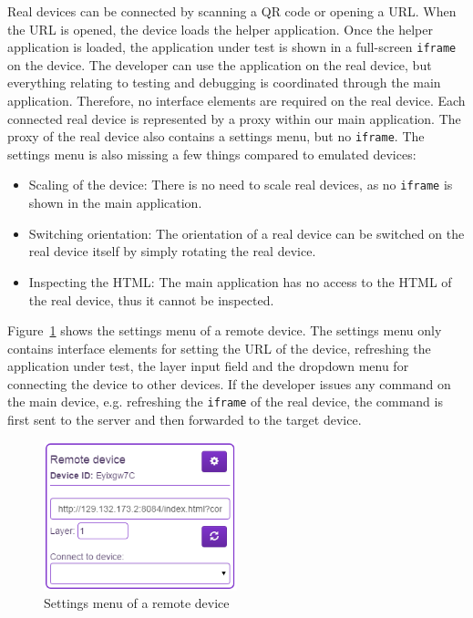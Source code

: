 Real devices can be connected by scanning a QR code or opening a URL. When the URL is opened, the device loads the helper application. Once the helper application is loaded, the application under test is shown in a full-screen \lstinline|iframe| on the device. The developer can use the application on the real device, but everything relating to testing and debugging is coordinated through the main application. Therefore, no interface elements are required on the real device. Each connected real device is represented by a proxy within our main application. The proxy of the real device also contains a settings menu, but no \lstinline|iframe|. The settings menu is also missing a few things compared to emulated devices:
\begin{itemize}
	\item Scaling of the device: There is no need to scale real devices, as no \lstinline|iframe| is shown in the main application.
	\item Switching orientation: The orientation of a real device can be switched on the real device itself by simply rotating the real device.
	\item Inspecting the HTML: The main application has no access to the HTML of the real device, thus it cannot be inspected.
\end{itemize}
Figure~\ref{fig:settings_menu_remote} shows the settings menu of a remote device. The settings menu only contains interface elements for setting the URL of the device, refreshing the application under test, the layer input field and the dropdown menu for connecting the device to other devices. If the developer issues any command on the main device, e.g. refreshing the \lstinline|iframe| of the real device, the command is first sent to the server and then forwarded to the target device. 

\begin{figure}[H]
  \centering
    \includegraphics[width=0.5\textwidth]{images/screenshots/remote_device.png}
	\caption[Screenshot: Settings menu remote device]{Settings menu of a remote device}
	\label{fig:settings_menu_remote}
\end{figure}


